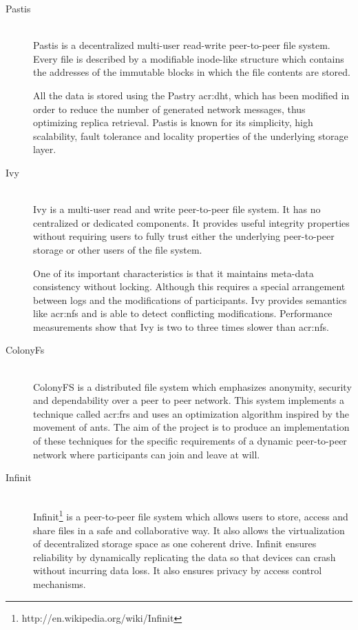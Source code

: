 \begin{description}
	\item[Pastis]\-\\
	Pastis \cite{Busca:2005gt} is a decentralized multi-user read-write peer-to-peer file system. Every file is described by
a modifiable inode-like structure which contains the addresses of the immutable blocks in which the file contents are stored.

All the data is stored using the Pastry \gls{acr:dht}, which has been modified in order to reduce the number of generated network messages, thus optimizing replica retrieval. Pastis is known for its simplicity, high scalability, fault tolerance and locality properties of the underlying storage layer.

	\item[Ivy]\-\\
	Ivy \cite{Muthitacharoen:2002iv} is a multi-user read and write peer-to-peer file system. It has no centralized or dedicated components. It provides useful integrity properties without requiring users to fully trust either the underlying peer-to-peer storage or other users of the file system.
	
	One of its important characteristics is that it maintains meta-data consistency without locking. Although  this requires a special arrangement between logs and the modifications of participants. Ivy provides semantics like \gls{acr:nfs} and is able to detect conflicting modifications. Performance measurements show that Ivy is two to three times slower than \gls{acr:nfs}.
	\item[ColonyFs]\-\\
	ColonyFS \cite{Colony:2009fs} is a distributed file system which emphasizes anonymity, security and dependability over a peer to peer network. This system implements a technique called \gls{acr:frs} and uses an optimization algorithm inspired by the movement of ants. The aim of the project is to produce an implementation of these techniques for the specific requirements of a dynamic peer-to-peer network where participants can join and leave at will.
	\item[Infinit]\-\\
	Infinit\footnote{http://en.wikipedia.org/wiki/Infinit} is a peer-to-peer file system which allows users to store, access and share files in a safe and collaborative way. It also allows the virtualization of decentralized storage space as one coherent drive. Infinit ensures reliability by dynamically replicating the data so that devices can crash without incurring data loss. It also ensures privacy by access control mechanisms.
	

\end{description}
